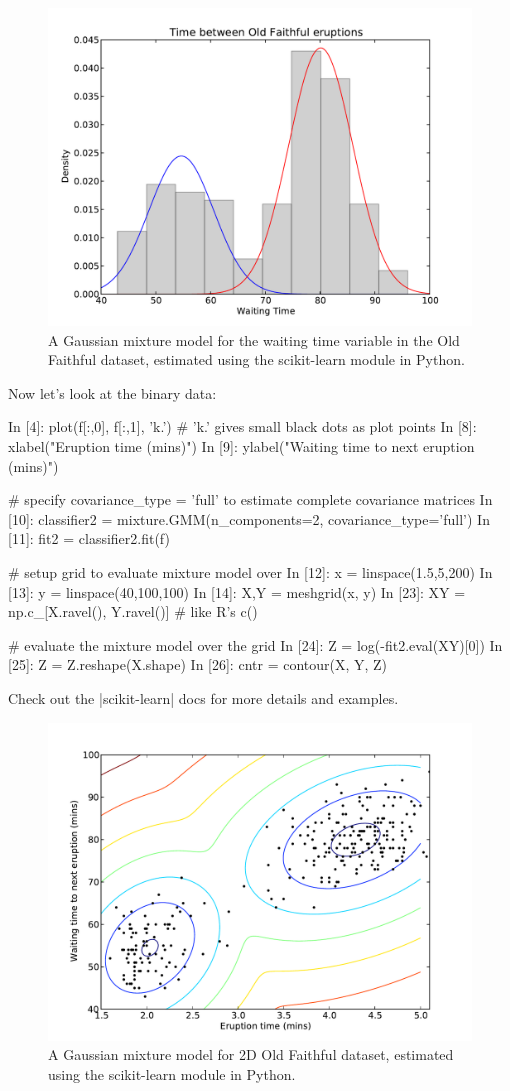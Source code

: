\begin{figure}[!ht]
    \centering
    \includegraphics[width=0.5\columnwidth]{./faithful-python.pdf}
    \caption{A Gaussian mixture model for the waiting time variable in the Old Faithful dataset, estimated using the scikit-learn module in Python.}\label{fig:faithfulpy}
\end{figure}

Now let's look at the binary data:
%
\begin{python}
In [4]: plot(f[:,0], f[:,1], 'k.')  # 'k.' gives small black dots as plot points
In [8]: xlabel("Eruption time (mins)")
In [9]: ylabel("Waiting time to next eruption (mins)")

# specify covariance_type = 'full' to estimate complete covariance matrices
In [10]: classifier2 = mixture.GMM(n_components=2, covariance_type='full')
In [11]: fit2 = classifier2.fit(f)

# setup grid to evaluate mixture model over
In [12]: x = linspace(1.5,5,200)
In [13]: y = linspace(40,100,100)
In [14]: X,Y = meshgrid(x, y)
In [23]: XY = np.c_[X.ravel(), Y.ravel()] # like R's c()

# evaluate the mixture model over the grid
In [24]: Z = log(-fit2.eval(XY)[0])
In [25]: Z = Z.reshape(X.shape)
In [26]: cntr = contour(X, Y, Z)
\end{python}
Check out the |scikit-learn| docs for more details and examples.

\begin{figure}[!ht]
    \centering
    \includegraphics[width=0.5\columnwidth]{./faithful2d-python.pdf}
    \caption{A Gaussian mixture model for 2D Old Faithful dataset, estimated using the scikit-learn module in Python.}\label{fig:faithfulpy2}
\end{figure}


